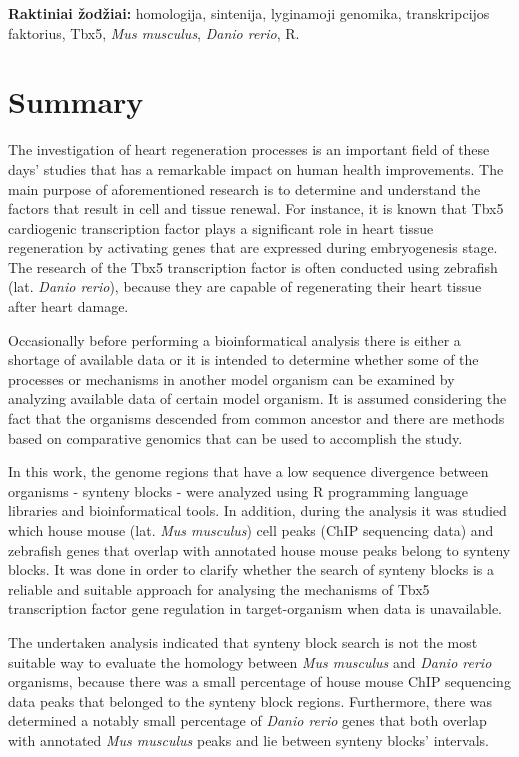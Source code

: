 \documentclass[12pt]{article}
\begin{document}
\hfill \break

\textbf{Raktiniai žodžiai:} homologija, sintenija, lyginamoji genomika,
transkripcijos faktorius, Tbx5, \emph{Mus musculus}, \emph{Danio rerio}, R.

\newpage


\section*{Summary}
The investigation of heart regeneration processes is an important field of
these days' studies that has a remarkable impact on human health improvements.
The main purpose of aforementioned research is to determine and understand the
factors that result in cell and tissue renewal. For instance, it is known that
Tbx5 cardiogenic transcription factor plays a significant role in heart tissue
regeneration by activating genes that are expressed during embryogenesis stage.
The research of the Tbx5 transcription factor is often conducted using 
zebrafish (lat. \emph{Danio rerio}), because they are capable of regenerating
their heart tissue after heart damage.

Occasionally before performing a bioinformatical analysis there is either
a shortage of available data or it is intended to determine whether some of the
processes or mechanisms in another model organism can be examined by analyzing
available data of certain model organism. It is assumed considering the fact
that the organisms descended from common ancestor and there are methods based
on comparative genomics that can be used to accomplish the study.

In this work, the genome regions that have a low sequence divergence between
organisms - synteny blocks - were analyzed using R programming language
libraries and bioinformatical tools. In addition, during the analysis it was
studied which house mouse (lat. \emph{Mus musculus}) cell peaks (ChIP sequencing
data) and zebrafish genes that overlap with annotated house mouse peaks belong
to synteny blocks. It was done in order to clarify whether the search of synteny
blocks is a reliable and suitable approach for analysing the mechanisms of Tbx5
transcription factor gene regulation in target-organism when data is
unavailable.

The undertaken analysis indicated that synteny block search is not the most
suitable way to evaluate the homology between \emph{Mus musculus} and
\emph{Danio rerio} organisms, because there was a small percentage of house
mouse ChIP sequencing data peaks that belonged to the synteny block regions.
Furthermore, there was determined a notably small percentage of
\emph{Danio rerio} genes that both overlap with annotated \emph{Mus musculus}
peaks and lie between synteny blocks' intervals.
\end{document}
